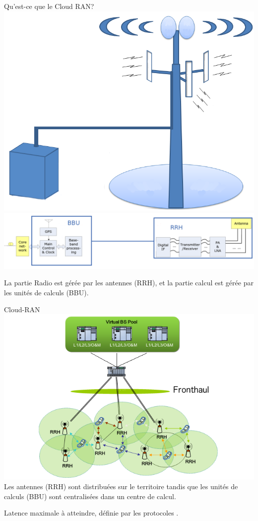 \documentclass[10 pt]{beamer}
\begin{document}
\begin{frame}{Qu'est-ce que le Cloud RAN?}
  \centering
  \includegraphics[scale=0.2]{cloudbts.png}\\
  \includegraphics[scale=0.175]{BBURRH.png}
  
La partie Radio est gérée par les antennes (RRH), et la partie calcul est gérée par les unités de calculs (BBU).
\end{frame}



\begin{frame}{Cloud-RAN}
  \centering
  \includegraphics[scale=0.3]{CRAN}\\
  \vspace{0.5cm}
  \pause
   Les antennes (RRH) sont distribuées sur le territoire tandis que les unités de calculs (BBU) sont centralisées dans un centre de calcul.
  
  \pause

  Latence maximale à atteindre, définie par les protocoles .
  
  
\end{frame}
\end{document}

